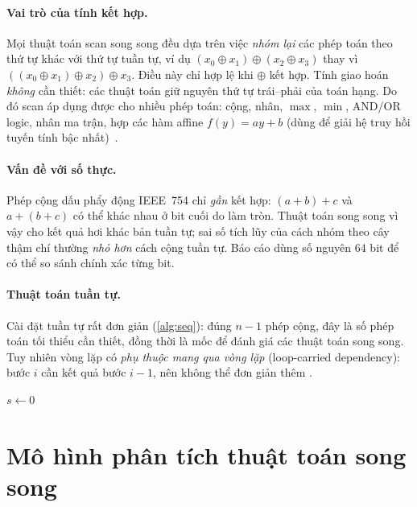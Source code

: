 \paragraph{Vai trò của tính kết hợp.} Mọi thuật toán scan song song đều dựa trên việc
\emph{nhóm lại} các phép toán theo thứ tự khác với thứ tự tuần tự, ví dụ
\((x_0 \oplus x_1) \oplus (x_2 \oplus x_3)\) thay vì \(((x_0 \oplus x_1) \oplus x_2) \oplus x_3\).
Điều này chỉ hợp lệ khi \(\oplus\) kết hợp. Tính giao hoán \emph{không} cần thiết: các thuật toán
giữ nguyên thứ tự trái--phải của toán hạng. Do đó scan áp dụng được cho nhiều phép toán:
cộng, nhân, \(\max\), \(\min\), AND/OR logic, nhân ma trận, hợp các hàm affine
\(f(y) = ay + b\) (dùng để giải hệ truy hồi tuyến tính bậc nhất)~\cite{blelloch1990}.

\paragraph{Vấn đề với số thực.} Phép cộng dấu phẩy động IEEE~754 chỉ \emph{gần} kết hợp:
\((a + b) + c\) và \(a + (b + c)\) có thể khác nhau ở bit cuối do làm tròn. Thuật toán song song
vì vậy cho kết quả hơi khác bản tuần tự; sai số tích lũy của cách nhóm theo cây thậm chí thường
\emph{nhỏ hơn} cách cộng tuần tự. Báo cáo dùng số nguyên 64 bit để có thể so sánh chính xác
từng bit.

\paragraph{Thuật toán tuần tự.} Cài đặt tuần tự rất đơn giản (\cref{alg:seq}): đúng \(n-1\)
phép cộng, đây là số phép toán tối thiểu cần thiết, đồng thời là mốc để đánh giá các thuật toán
song song. Tuy nhiên vòng lặp có \emph{phụ thuộc mang qua vòng lặp} (loop-carried dependency):
bước \(i\) cần kết quả bước \(i-1\), nên không thể đơn giản thêm .

\begin{algorithm}[H]
\caption{Inclusive scan tuần tự}
\label{alg:seq}
\(s \gets 0\)\;
\end{algorithm}

\section{Mô hình phân tích thuật toán song song}
\label{sec:workspan}

